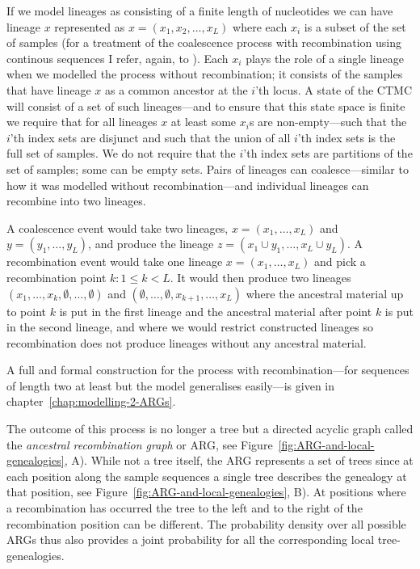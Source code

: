 If we model lineages as consisting of a finite length of nucleotides we can have lineage $x$ represented as $x=(x_1,x_2,\ldots,x_L)$ where each $x_i$ is a subset of the set of samples (for a treatment of the coalescence process with recombination using continous sequences I refer, again, to \citet{Hein:2005vz}). Each $x_i$ plays the role of a single lineage when we modelled the process without recombination; it consists of the samples that have lineage $x$ as a common ancestor at the $i$'th locus. A state of the CTMC will consist of a set of such lineages---and to ensure that this state space is finite we require that for all lineages $x$ at least some $x_i$s are non-empty---such that the $i$'th index sets are disjunct and such that the union of all $i$'th index sets is the full set of samples. We do not require that the $i$'th index sets are partitions of the set of samples; some can be empty sets. Pairs of lineages can coalesce---similar to how it was modelled without recombination---and individual lineages can recombine into two lineages.

A coalescence event would take two lineages, $x=(x_1,\ldots,x_L)$ and $y=(y_1,\ldots,y_L)$, and produce the lineage $z=(x_1\cup y_1,\ldots,x_L\cup y_L)$. A recombination event would take one lineage $x=(x_1,\ldots,x_L)$ and pick a recombination point $k: 1 \leq k < L$. It would then produce two lineages $(x_1,\ldots,x_k,\emptyset,\ldots,\emptyset)$ and $(\emptyset,\ldots,\emptyset,x_{k+1},\ldots,x_L)$ where the ancestral material up to point $k$ is put in the first lineage and the ancestral material after point $k$ is put in the second lineage, and where we would restrict constructed lineages so recombination does not produce lineages without any ancestral material.

A full and formal construction for the process with recombination---for sequences of length two at least but the model generalises easily---is given in chapter~\ref{chap:modelling-2-ARGs}.

The outcome of this process is no longer a tree but a directed acyclic graph called the \emph{ancestral recombination graph} or ARG, see Figure~\ref{fig:ARG-and-local-genealogies}, A). While not a tree itself, the ARG represents a set of trees since at each position along the sample sequences a single tree describes the genealogy at that position, see Figure~\ref{fig:ARG-and-local-genealogies}, B). At positions where a recombination has occurred the tree to the left and to the right of the recombination position can be different. The probability density over all possible ARGs thus also provides a joint probability for all the corresponding local tree-genealogies.

